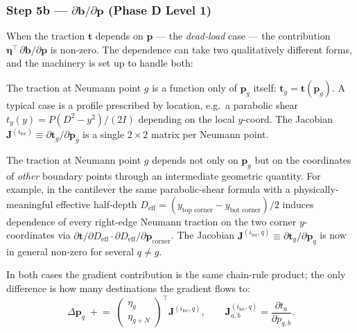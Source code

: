 \documentclass[11pt,a4paper]{article}
\newcommand{\mat}[1]{\mathbf{#1}}
\newcommand{\vect}[1]{\boldsymbol{#1}}
\newcommand{\pts}{\vect{p}}
\begin{document}
\subsubsection{Step 5b ---
\texorpdfstring{$\partial\vect b/\partial\pts$ (Phase D Level 1)}
{db/dp (Phase D L1)}}
\label{sec:step5-load}

When the traction $\vect t$ depends on $\pts$ --- the
\emph{dead-load} case --- the contribution
$\vect\eta^\top\,\partial\vect b/\partial\pts$ is non-zero. The
dependence can take two qualitatively different forms, and the
machinery is set up to handle both:
\begin{description}[leftmargin=2em,style=nextline]
  \item[\textbf{Direct local dependence.}]
    The traction at Neumann point $g$ is a function only of $\pts_g$
    itself: $\vect t_g = \vect t(\pts_g)$. A typical case is a
    profile prescribed by location, e.g.\ a parabolic shear
    $t_y(y) = P(D^2 - y^2)/(2I)$ depending on the local $y$-coord.
    The Jacobian
    $\mat J^{(i_{\text{loc}})} \equiv \partial\vect t_g/\partial\pts_g$
    is a single $2\times 2$ matrix per Neumann point.
  \item[\textbf{Indirect non-local dependence.}]
    The traction at Neumann point $g$ depends not only on $\pts_g$
    but on the coordinates of \emph{other} boundary points through
    an intermediate geometric quantity. For example, in the
    cantilever the same parabolic-shear formula with a
    physically-meaningful effective half-depth
    $D_{\text{eff}} = (y_{\text{top corner}} - y_{\text{bot corner}})/2$
    induces dependence of every right-edge Neumann traction on the
    two corner $y$-coordinates via
    $\partial \vect t/\partial D_{\text{eff}}
     \cdot \partial D_{\text{eff}}/\partial \pts_{\text{corner}}$.
    The Jacobian
    $\mat J^{(i_{\text{loc}}, q)} \equiv \partial\vect t_g/\partial\pts_q$
    is now in general non-zero for several $q \ne g$.
\end{description}
In both cases the gradient contribution is the same chain-rule
product; the only difference is how many destinations the gradient
flows to:
\begin{equation}
  \boxed{\;
  \Delta\pts_q \;\mathrel{+}=\;
  \begin{pmatrix} \eta_g \\ \eta_{g+N} \end{pmatrix}^{\!\top}\!
  \mat J^{(i_{\text{loc}}, q)},
  \qquad
  \mat J^{(i_{\text{loc}}, q)}_{a,b}
    = \frac{\partial t_a}{\partial p_{q,b}}.\;}
  \label{eq:l1-eta-side}
\end{equation}
\end{document}
